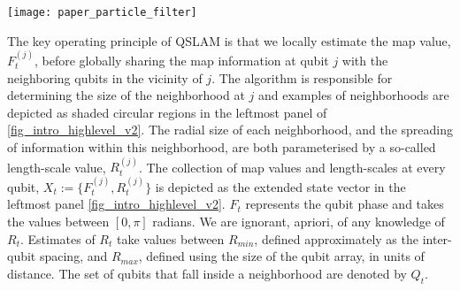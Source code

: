 \documentclass[reprint,longbibliography]{revtex4-1} %
\begin{document}
\begin{figure*}
	\texttt{[image: paper\_particle\_filter]}
	\caption{\label{fig_intro_highlevel_v2} Schematic overview of QSLAM for an incoming qubit measurement, $Y^{(j)}_t$ at qubit $j$. A particle filter estimates the map, $F_t$, and discovers neighborhoods [circular shaded] parameterised by $R_t^{(j)}$ for sharing state information about $j$. Posterior state estimates from the particle filter are used (a) by the controller, to choose $k$ as the location of the next measurement, $Y^{(k)}_{t+1}$ based on regions of highest estimated uncertainty [middle top]; (b) to share information at $j$ within the posterior neighborhood, $Q$ via $\hat{Y}^{(q)}_{t+1}$, for  all $q \in Q$ [middle bottom] before commencing the next iteration.}  	
\end{figure*} 

The key operating principle of QSLAM is that we locally estimate the map value, $F_t^{(j)}$, before globally sharing the map information at qubit $j$ with the neighboring qubits in the vicinity of $j$. The algorithm is responsible for determining the size of the neighborhood at $j$ and examples of neighborhoods are depicted as shaded circular regions in the leftmost panel of \cref{fig_intro_highlevel_v2}. The radial size of each neighborhood, and the spreading of information within this neighborhood, are both parameterised by a so-called length-scale value, $R_t^{(j)}$.   The collection of map values and length-scales at every qubit, $X_t:=\{F_t^{(j)}, R_t^{(j)}\}$ is depicted as the extended state vector in the leftmost panel \cref{fig_intro_highlevel_v2}.  $F_t$ represents the qubit phase and takes the values between $[0, \pi]$ radians. We are ignorant, apriori, of any knowledge of $R_t$. Estimates of $R_t$ take values between $R_{min}$, defined approximately as the inter-qubit spacing, and $R_{max}$, defined using the size of the qubit array, in units of distance. The set of qubits that fall inside a neighborhood are denoted by $Q_t$. %
\end{document}
